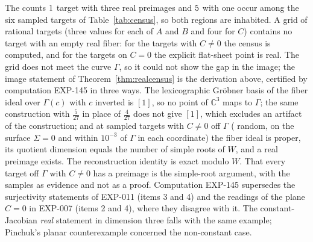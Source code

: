 \documentclass[11pt]{article}
\theoremstyle{definition}
\theoremstyle{remark}
\newcommand{\C}{\mathbb{C}}
\begin{document}
\begin{table}[t]\centering\small

\caption{Real census of $F$ at the sampled targets, read from the stored outputs of EXP-011 (rows above the rule), EXP-007 and EXP-001: the sign of the discriminant $D$, the number of real roots of $W$ (Sturm route), the number of real points of the exact fiber (Gr\"obner route) and the number of escaping roots. The two routes agree at every target.}
\label{tab:census}
\end{table}

The counts $1$ target with three real preimages and $5$ with one occur among the six sampled targets of Table~\ref{tab:census}, so both regions are inhabited. A grid of \numGrid{} rational targets (three values for each of $A$ and $B$ and four for $C$) contains no target with an empty real fiber: for the \numGridNoPlane{} targets with $C \neq 0$ the census is computed, and for the \numGridPlane{} targets on $C = 0$ the explicit flat-sheet point is real. The grid does not meet the curve $\Gamma$, so it could not show the gap in the image; the image statement of Theorem~\ref{thm:realcensus} is the derivation above, certified by computation EXP-145 in three ways. The lexicographic Gr\"obner basis of the fiber ideal over $\Gamma(c)$ with $c$ inverted is $[1]$, so no point of $\C^3$ maps to $\Gamma$; the same construction with $\tfrac{5}{27}$ in place of $\tfrac{4}{27}$ does not give $[1]$, which excludes an artifact of the construction; and at \numImgTargets{} sampled targets with $C \neq 0$ off $\Gamma$ (\numImgRandom{} random, \numImgSigma{} on the surface $\Sigma = 0$ and \numImgNear{} within $10^{-3}$ of $\Gamma$ in each coordinate) the fiber ideal is proper, its quotient dimension equals the number of simple roots of $W$, and a real preimage exists. The reconstruction identity is exact modulo $W$. That every target off $\Gamma$ with $C \neq 0$ has a preimage is the simple-root argument, with the samples as evidence and not as a proof. Computation EXP-145 supersedes the surjectivity statements of EXP-011 (items 3 and 4) and the readings of the plane $C = 0$ in EXP-007 (items 2 and 4), where they disagree with it. The constant-Jacobian \emph{real} statement in dimension three falls with the same example; Pinchuk's planar counterexample \cite{Pinchuk1994} concerned the non-constant case.
\end{document}
